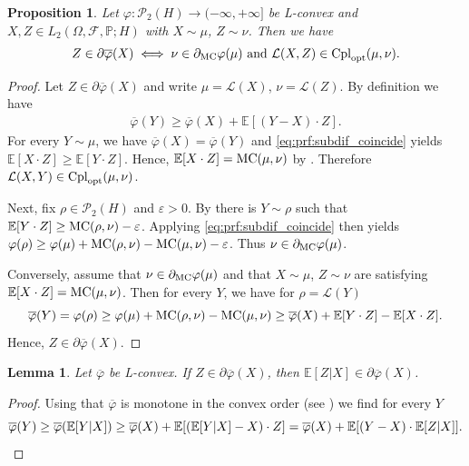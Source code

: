 \documentclass[a4paper]{amsart}
\numberwithin{theorem}{section}
\newtheorem{lemma}[theorem]{Lemma}
\newtheorem{proposition}[theorem]{Proposition}
\theoremstyle{definition}
\newcommand{\E}{\mathbb{E}}
\newcommand{\F}{\mathcal{F}}
\newcommand{\law}{\mathcal{L}}
\newcommand{\cpl}{\textup{Cpl}}
\newcommand{\Pc}{\mathcal P}
\renewcommand{\P}{\mathbb{P}}
\newcommand{\cplopt}{\cpl_{\rm opt}}
\renewcommand{\H}{H}
\renewcommand{\phi}{\varphi}
\newcommand{\mc}{\textup{MC}}
\begin{document}
\begin{proposition}\label{prop:Subdiff_MCvsL}
Let $\phi: \Pc_2(\H) \to (-\infty, +\infty]$ be L-convex and $X,Z \in L_2(\Omega,\F,\P;\H)$ with $X\sim \mu$, $Z\sim \nu$. Then we have
\begin{align*}
    Z  \in  \partial \overline{\phi}(X) \iff \nu \in \partial_{\mc}\phi(\mu) \text{ and } \law(X,Z) \in \cplopt(\mu,\nu).
\end{align*}
\end{proposition}
\begin{proof}
Let   $Z  \in  \partial \overline{\phi}(X)$ and write $\mu = \law(X)$, $\nu= \law(Z)$. By definition we have 
\begin{align}\label{eq:prf:subdif_coincide}
\overline{\phi}(Y) \ge \overline{\phi}(X) + \E[(Y-X)\cdot Z].    
\end{align}
For every $Y \sim \mu$, we have $\overline{\phi}(X) = \overline{\phi}(Y)$ and   \eqref{eq:prf:subdif_coincide} yields $\E[X \cdot Z] \ge \E [ Y \cdot Z]$. Hence, $\E[X \cdot Z] = \mc(\mu,\nu)$ by . Therefore $\law (X,Y)\in \cplopt(\mu, \nu)$. 

Next, fix $\rho \in \Pc_2(\H)$ and $\varepsilon >0$. By  there is $Y \sim \rho$ such that $\E[Y \cdot Z] \ge \mc(\rho,\nu) - \varepsilon$. Applying \eqref{eq:prf:subdif_coincide} then yields $\phi(\rho) \ge \phi(\mu) + \mc(\rho,\nu) - \mc(\mu,\nu) - \varepsilon$. Thus $\nu\in \partial_{\mc} \phi(\mu)$.

\medskip

Conversely, assume that $\nu \in \partial_\mc\phi(\mu)$ and that $X \sim \mu$, $Z \sim \nu$ are satisfying $\E[X \cdot Z] = \mc(\mu,\nu)$. Then for every $Y$, we have for $\rho = \law(Y)$
\[
\overline{\phi}(Y) = \phi(\rho) \ge \phi(\mu) + \mc(\rho,\nu) - \mc(\mu,\nu) \ge \overline{\phi}(X) + \E[ Y \cdot Z] - \E[X \cdot Z].
\]
Hence, $ Z  \in  \partial \overline{\phi}(X)$.
\end{proof}

\begin{lemma}\label{lem:subdiff_cond}
Let $\overline{\phi}$ be L-convex. If $Z \in \partial \overline{\phi}(X)$, then $\E[Z|X] \in \partial \overline{\phi}(X)$.
\end{lemma}
\begin{proof}
Using that $\overline{\phi}$ is monotone in the convex order (see ) we find for every $Y$
\[
\overline{\phi}(Y) \ge \overline{\phi}( \E[Y|X] ) \ge \overline{\phi}(X) + \E[ (\E[Y|X]-X) \cdot Z ] = \overline{\phi}(X) + \E[ (Y-X) \cdot \E[ Z|X] ]. \qedhere
\]
\end{proof}
\end{document}
